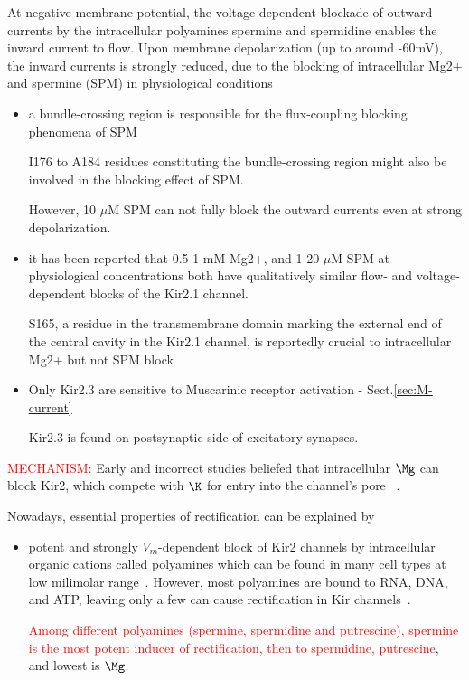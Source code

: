 At negative membrane potential, the voltage-dependent blockade of
outward currents by the intracellular polyamines spermine and spermidine
enables the inward current to flow.
Upon membrane depolarization (up to around -60mV), the inward currents is
strongly reduced, due to the blocking of
intracellular Mg2+ and spermine (SPM) in physiological conditions
\citep{huang2016}
\begin{itemize}
  \item  a bundle-crossing region is responsible for the flux-coupling blocking
  phenomena of SPM 
  
  I176 to A184 residues constituting the bundle-crossing region might also be
  involved in the blocking effect of SPM.
  
  However, 10 $\mu$M SPM can not fully block the outward currents even at strong
  depolarization.
  
  \item it has been reported that 0.5-1 mM Mg2+, and 1-20 $\mu$M SPM at
  physiological concentrations both have qualitatively similar flow- and
  voltage-dependent blocks of the Kir2.1 channel.
  
  S165, a residue in the transmembrane domain marking the
  external end of the central cavity in the Kir2.1 channel, is reportedly crucial to intracellular
  Mg2+ but not SPM block
  
  \item Only Kir2.3 are sensitive to Muscarinic receptor activation -
  Sect.\ref{sec:M-current}
  
  Kir2.3 is found on postsynaptic side of excitatory synapses.
  
\end{itemize}

\textcolor{red}{MECHANISM:} 
Early and incorrect studies beliefed that intracellular $\Mg$ can block
Kir2, which compete with $\K$ for entry into the channel's pore
~\citep{Guo2002}. 

Nowadays, essential properties of rectification can be explained by
\begin{itemize}
\item potent and strongly $V_m$-dependent block of Kir2 channels by
  intracellular organic cations called polyamines which can be found
  in many cell types at low milimolar
  range~\citep{Cohen1998}. However, most polyamines are bound to RNA,
  DNA, and ATP, leaving only a few can cause rectification in Kir
  channels~\citep{Yan2005}.

  \textcolor{red}{Among different polyamines (spermine, spermidine and
    putrescine), spermine is the most potent inducer of rectification,
    then to spermidine, putrescine}, and lowest is $\Mg$.
\end{itemize}

